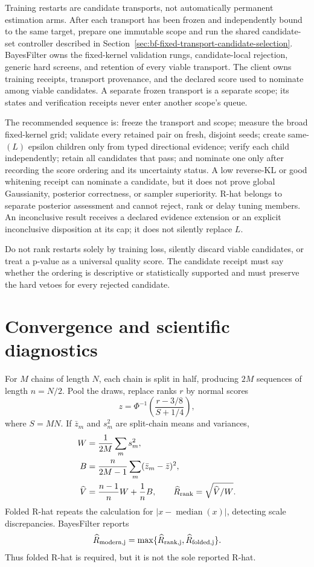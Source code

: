 Training restarts are candidate transports, not automatically permanent
estimation arms. After each transport has been frozen and independently bound
to the same target, prepare one immutable scope and run the shared candidate-set
controller described in Section~\ref{sec:bf-fixed-transport-candidate-selection}.
BayesFilter owns the fixed-kernel validation rungs, candidate-local rejection,
generic hard screens, and retention of every viable transport. The client owns
training receipts, transport provenance, and the declared score used to
nominate among viable candidates. A separate frozen transport is a separate
scope; its states and verification receipts never enter another scope's queue.

The recommended sequence is: freeze the transport and scope; measure the broad
fixed-kernel grid; validate every retained pair on fresh, disjoint seeds; create
same-$(L)$ epsilon children only from typed directional evidence; verify each
child independently; retain all candidates that pass; and nominate one only
after recording the score ordering and its uncertainty status. A low reverse-KL
or good whitening receipt can nominate a candidate, but it does not prove global
Gaussianity, posterior correctness, or sampler superiority. R-hat belongs to
separate posterior assessment and cannot reject, rank or delay tuning members.
An inconclusive result receives a declared evidence extension or an explicit
inconclusive disposition at its cap; it does not silently replace $L$.

Do not rank restarts solely by training loss, silently discard viable
candidates, or treat a p-value as a universal quality score. The candidate
receipt must say whether the ordering is descriptive or statistically
supported and must preserve the hard vetoes for every rejected candidate.

\section{Convergence and scientific diagnostics}
\label{sec:bf-neutra-hmc-protocol}

For $M$ chains of length $N$, each chain is split in half, producing $2M$
sequences of length $n=N/2$.  Pool the draws, replace ranks $r$ by normal
scores
\begin{equation}
 z=\Phi^{-1}\!\left(\frac{r-3/8}{S+1/4}\right),
\end{equation}
where $S=MN$.  If $\bar z_m$ and $s_m^2$ are split-chain means and variances,
\begin{align}
 W&=\frac1{2M}\sum_m s_m^2,\\
 B&=\frac{n}{2M-1}\sum_m(\bar z_m-\bar z)^2,\\
 \widehat V&=\frac{n-1}{n}W+\frac1nB,\qquad
 \widehat R_{\rm rank}=\sqrt{\widehat V/W}.
\end{align}
Folded R-hat repeats the calculation for
$|x-\operatorname{median}(x)|$, detecting scale discrepancies.  BayesFilter
reports
\begin{equation}
 \widehat R_{\rm modern,j}=\max\{\widehat R_{\rm rank,j},
 \widehat R_{\rm folded,j}\}.
 \label{eq:bf-neutra-modern-rhat}
\end{equation}
Thus folded R-hat is required, but it is not the sole reported R-hat.

